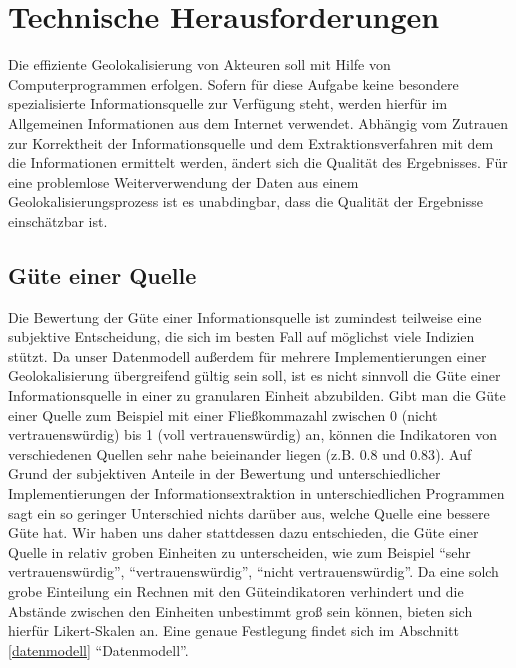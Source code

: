 \section{Technische Herausforderungen}
Die effiziente Geolokalisierung von Akteuren soll mit Hilfe von Computerprogrammen erfolgen. Sofern für diese Aufgabe keine besondere spezialisierte Informationsquelle zur Verfügung steht, werden hierfür im Allgemeinen Informationen aus dem Internet verwendet. Abhängig vom Zutrauen zur Korrektheit der Informationsquelle und dem Extraktionsverfahren mit dem die Informationen ermittelt werden, ändert sich die Qualität des Ergebnisses. Für eine problemlose Weiterverwendung der Daten aus einem Geolokalisierungsprozess ist es unabdingbar, dass die Qualität der Ergebnisse einschätzbar ist.

\subsection{Güte einer Quelle}
Die Bewertung der Güte einer Informationsquelle ist zumindest teilweise eine subjektive Entscheidung, die sich im besten Fall auf möglichst viele Indizien stützt. Da unser Datenmodell außerdem für mehrere Implementierungen einer Geolokalisierung übergreifend gültig sein soll, ist es nicht sinnvoll die Güte einer Informationsquelle in einer zu granularen Einheit abzubilden. Gibt man die Güte einer Quelle zum Beispiel mit einer Fließkommazahl zwischen 0 (nicht vertrauenswürdig) bis 1 (voll vertrauenswürdig) an, können die Indikatoren von verschiedenen Quellen sehr nahe beieinander liegen (z.B. $0.8$ und $0.83$). Auf Grund der subjektiven Anteile in der Bewertung und unterschiedlicher Implementierungen der Informationsextraktion in unterschiedlichen Programmen sagt ein so geringer Unterschied nichts darüber aus, welche Quelle eine bessere Güte hat. Wir haben uns daher stattdessen dazu entschieden, die Güte einer Quelle in relativ groben Einheiten zu unterscheiden, wie zum Beispiel ``sehr vertrauenswürdig'', ``vertrauenswürdig'', ``nicht vertrauenswürdig''. Da eine solch grobe Einteilung ein Rechnen\label{calc_likert} mit den Güteindikatoren verhindert und die Abstände zwischen den Einheiten unbestimmt groß sein können, bieten sich hierfür Likert-Skalen an. Eine genaue Festlegung findet sich im Abschnitt \ref{datenmodell} ``Datenmodell''.

